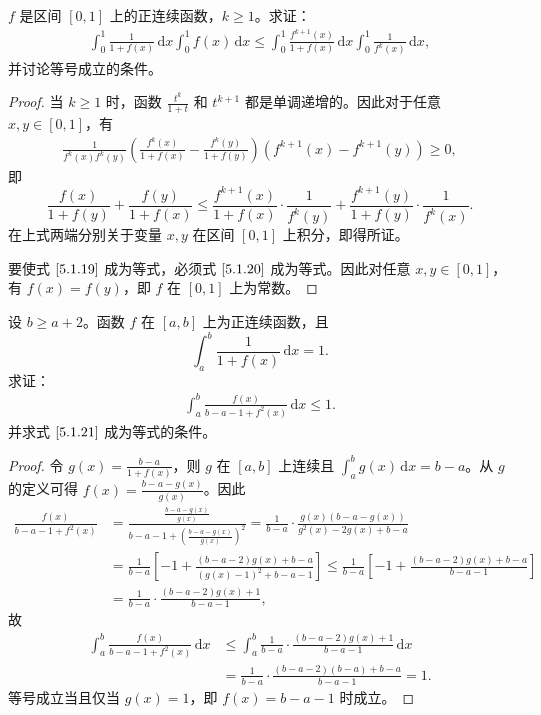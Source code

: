 \documentclass[../../main.tex]{subfiles}
\begin{document}
\begin{example}
\( f \) 是区间 \([0,1]\) 上的正连续函数，\( k \geqslant 1 \)。求证：
\begin{align}
\int_{0}^{1} \frac{1}{1 + f(x)} \, \mathrm{d}x \int_{0}^{1} f(x) \, \mathrm{d}x \leqslant \int_{0}^{1} \frac{f^{k + 1}(x)}{1 + f(x)} \, \mathrm{d}x \int_{0}^{1} \frac{1}{f^k(x)} \, \mathrm{d}x, \label{5.1.19}
\end{align}
并讨论等号成立的条件。
\end{example}
\begin{proof}
当 \( k \geqslant 1 \) 时，函数 \( \frac{t^k}{1 + t} \) 和 \( t^{k + 1} \) 都是单调递增的。因此对于任意 \( x, y \in [0,1] \)，有
\begin{align}
\frac{1}{f^k(x)f^k(y)} \left( \frac{f^k(x)}{1 + f(x)} - \frac{f^k(y)}{1 + f(y)} \right) \left( f^{k + 1}(x) - f^{k + 1}(y) \right) \geqslant 0, \label{5.1.20}
\end{align}
即
\[
\frac{f(x)}{1 + f(y)} + \frac{f(y)}{1 + f(x)} \leqslant \frac{f^{k + 1}(x)}{1 + f(x)} \cdot \frac{1}{f^k(y)} + \frac{f^{k + 1}(y)}{1 + f(y)} \cdot \frac{1}{f^k(x)}.
\]
在上式两端分别关于变量 \( x, y \) 在区间 \([0,1]\) 上积分，即得所证。

要使式 \(\eqref{5.1.19}\) 成为等式，必须式 \(\eqref{5.1.20}\) 成为等式。因此对任意 \( x, y \in [0,1] \)，有 \( f(x) = f(y) \)，即 \( f \) 在 \([0,1]\) 上为常数。

\end{proof}

\begin{example}
设 \( b \geqslant a + 2 \)。函数 \( f \) 在 \([a,b]\) 上为正连续函数，且
\[
\int_{a}^{b} \frac{1}{1 + f(x)} \, \mathrm{d}x = 1.
\]
求证：
\begin{align}
\int_{a}^{b} \frac{f(x)}{b - a - 1 + f^2(x)} \, \mathrm{d}x \leqslant 1. \label{5.1.21}
\end{align}
并求式 \(\eqref{5.1.21}\) 成为等式的条件。
\end{example}
\begin{proof}
令 \( g(x) = \frac{b - a}{1 + f(x)} \)，则 \( g \) 在 \([a,b]\) 上连续且 \( \int_{a}^{b} g(x) \, \mathrm{d}x = b - a \)。从 \( g \) 的定义可得 \( f(x) = \frac{b - a - g(x)}{g(x)} \)。因此
\begin{align*}
\frac{f(x)}{b-a-1+f^2(x)}&=\frac{\frac{b-a-g(x)}{g(x)}}{b-a-1+\left( \frac{b-a-g(x)}{g(x)} \right) ^2}=\frac{1}{b-a}\cdot \frac{g(x)(b-a-g(x))}{g^2(x)-2g(x)+b-a}
\\
&=\frac{1}{b-a}\left[ -1+\frac{(b-a-2)g(x)+b-a}{(g(x)-1)^2+b-a-1} \right] \leqslant \frac{1}{b-a}\left[ -1+\frac{(b-a-2)g(x)+b-a}{b-a-1} \right] 
\\
&=\frac{1}{b-a}\cdot \frac{(b-a-2)g(x)+1}{b-a-1},
\end{align*}
故
\begin{align*}
\int_a^b{\frac{f(x)}{b-a-1+f^2(x)}\,\mathrm{d}x}&\leqslant \int_a^b{\frac{1}{b-a}}\cdot \frac{(b-a-2)g(x)+1}{b-a-1}\,\mathrm{d}x
\\
&=\frac{1}{b-a}\cdot \frac{(b-a-2)(b-a)+b-a}{b-a-1}=1.
\end{align*}
等号成立当且仅当 \( g(x) = 1 \)，即 \( f(x) = b - a - 1 \) 时成立。

\end{proof}
\end{document}

